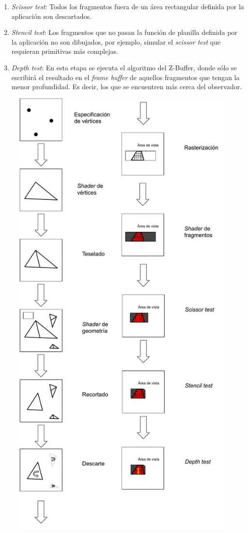 \begin{enumerate}
\begin{enumerate}
			\item \textit{Scissor test}: Todos los fragmentos fuera de un área rectangular definida por la aplicación son descartados.
			\item \textit{Stencil test}: Los fragmentos que no pasan la función de planilla definida por la aplicación no son dibujados, por ejemplo, simular el \textit{scissor test} que requieran primitivas más complejas.
			\item \textit{Depth test}: En esta etapa se ejecuta el algoritmo del Z-Buffer, donde sólo se escribirá el resultado en el \textit{frame buffer} de aquellos fragmentos que tengan la menor profundidad. Es decir, los que se encuentren más cerca del observador.
		\end{enumerate}
\end{enumerate}

\vspace{5mm}
\begin{figure}[H]
	\centering
	\includegraphics[width=0.55\linewidth]{assets/OpenGL}
	\label{img:pipelinegl}
\end{figure}

